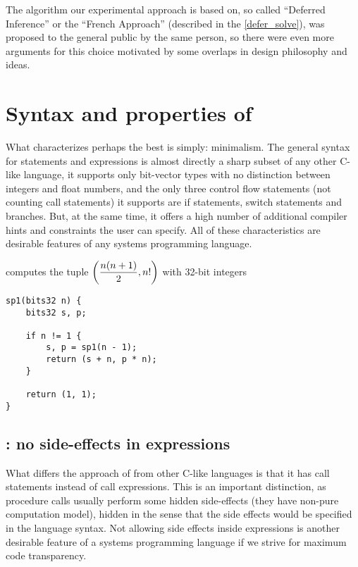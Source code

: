 The algorithm our experimental approach is based on, so called ``Deferred Inference'' or the ``French Approach'' (described in the \cref{defer_solve}), was proposed to the general public by the same person, so there were even more arguments for this choice motivated by some overlaps in design philosophy and ideas.

\section{Syntax and properties of \cmm{}}

What characterizes \cmm{} perhaps the best is simply: minimalism. The general syntax for statements and expressions is almost directly a sharp subset of any other C-like language, it supports only bit-vector types with no distinction between integers and float numbers, and the only three control flow statements (not counting call statements) it supports are if statements, switch statements and branches. But, at the same time, it offers a high number of additional compiler hints and constraints the user can specify. All of these characteristics are desirable features of any systems programming language.

\begin{ex}
     computes the tuple $\left(\dfrac{n(n+1)}{2}, n!\right)$ with 32-bit integers
    \begin{lstlisting}
sp1(bits32 n) {
    bits32 s, p;

    if n != 1 {
        s, p = sp1(n - 1);
        return (s + n, p * n);
    }

    return (1, 1);
}
    \end{lstlisting}
\end{ex}

\subsection{\cmm{}: no side-effects in expressions}

What differs the approach of \cmm{} from other C-like languages is that it has call statements instead of call expressions. This is an important distinction, as procedure calls usually perform some hidden side-effects (they have non-pure computation model), hidden in the sense that the side effects would be specified in the language syntax. Not allowing side effects inside expressions is another desirable feature of a systems programming language if we strive for maximum code transparency.

